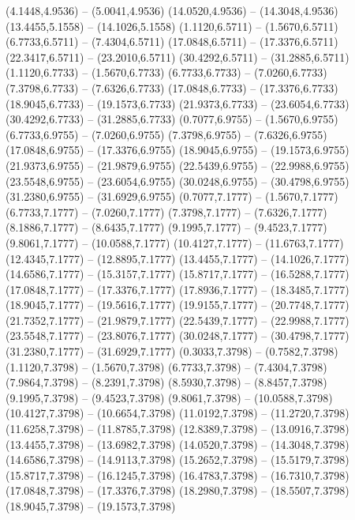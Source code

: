 {\begin{scope}[shift={(#1,#2)}]
    (4.1448,4.9536) -- (5.0041,4.9536)
    (14.0520,4.9536) -- (14.3048,4.9536)
    (13.4455,5.1558) -- (14.1026,5.1558)
    (1.1120,6.5711) -- (1.5670,6.5711)
    (6.7733,6.5711) -- (7.4304,6.5711)
    (17.0848,6.5711) -- (17.3376,6.5711)
    (22.3417,6.5711) -- (23.2010,6.5711)
    (30.4292,6.5711) -- (31.2885,6.5711)
    (1.1120,6.7733) -- (1.5670,6.7733)
    (6.7733,6.7733) -- (7.0260,6.7733)
    (7.3798,6.7733) -- (7.6326,6.7733)
    (17.0848,6.7733) -- (17.3376,6.7733)
    (18.9045,6.7733) -- (19.1573,6.7733)
    (21.9373,6.7733) -- (23.6054,6.7733)
    (30.4292,6.7733) -- (31.2885,6.7733)
    (0.7077,6.9755) -- (1.5670,6.9755)
    (6.7733,6.9755) -- (7.0260,6.9755)
    (7.3798,6.9755) -- (7.6326,6.9755)
    (17.0848,6.9755) -- (17.3376,6.9755)
    (18.9045,6.9755) -- (19.1573,6.9755)
    (21.9373,6.9755) -- (21.9879,6.9755)
    (22.5439,6.9755) -- (22.9988,6.9755)
    (23.5548,6.9755) -- (23.6054,6.9755)
    (30.0248,6.9755) -- (30.4798,6.9755)
    (31.2380,6.9755) -- (31.6929,6.9755)
    (0.7077,7.1777) -- (1.5670,7.1777)
    (6.7733,7.1777) -- (7.0260,7.1777)
    (7.3798,7.1777) -- (7.6326,7.1777)
    (8.1886,7.1777) -- (8.6435,7.1777)
    (9.1995,7.1777) -- (9.4523,7.1777)
    (9.8061,7.1777) -- (10.0588,7.1777)
    (10.4127,7.1777) -- (11.6763,7.1777)
    (12.4345,7.1777) -- (12.8895,7.1777)
    (13.4455,7.1777) -- (14.1026,7.1777)
    (14.6586,7.1777) -- (15.3157,7.1777)
    (15.8717,7.1777) -- (16.5288,7.1777)
    (17.0848,7.1777) -- (17.3376,7.1777)
    (17.8936,7.1777) -- (18.3485,7.1777)
    (18.9045,7.1777) -- (19.5616,7.1777)
    (19.9155,7.1777) -- (20.7748,7.1777)
    (21.7352,7.1777) -- (21.9879,7.1777)
    (22.5439,7.1777) -- (22.9988,7.1777)
    (23.5548,7.1777) -- (23.8076,7.1777)
    (30.0248,7.1777) -- (30.4798,7.1777)
    (31.2380,7.1777) -- (31.6929,7.1777)
    (0.3033,7.3798) -- (0.7582,7.3798)
    (1.1120,7.3798) -- (1.5670,7.3798)
    (6.7733,7.3798) -- (7.4304,7.3798)
    (7.9864,7.3798) -- (8.2391,7.3798)
    (8.5930,7.3798) -- (8.8457,7.3798)
    (9.1995,7.3798) -- (9.4523,7.3798)
    (9.8061,7.3798) -- (10.0588,7.3798)
    (10.4127,7.3798) -- (10.6654,7.3798)
    (11.0192,7.3798) -- (11.2720,7.3798)
    (11.6258,7.3798) -- (11.8785,7.3798)
    (12.8389,7.3798) -- (13.0916,7.3798)
    (13.4455,7.3798) -- (13.6982,7.3798)
    (14.0520,7.3798) -- (14.3048,7.3798)
    (14.6586,7.3798) -- (14.9113,7.3798)
    (15.2652,7.3798) -- (15.5179,7.3798)
    (15.8717,7.3798) -- (16.1245,7.3798)
    (16.4783,7.3798) -- (16.7310,7.3798)
    (17.0848,7.3798) -- (17.3376,7.3798)
    (18.2980,7.3798) -- (18.5507,7.3798)
    (18.9045,7.3798) -- (19.1573,7.3798)

\end{scope}}

